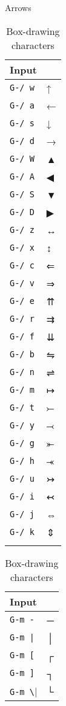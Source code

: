 \documentclass[oneside]{memoir}
\newcommand{\key}{\verb}
\begin{document}
{{{\begin{table}[!b]
\centering
\begin{minipage}{0.2\linewidth}
\caption{Arrows}
\label{tab:arrows}
\centering
\begin{tabular}{l>{\fallbackfontsymbol}l}
\toprule
Input & \multicolumn{1}{l}{Result} \\
\midrule
\key|G-/ w| & ↑ \\
\key|G-/ a| & ← \\
\key|G-/ s| & ↓ \\
\key|G-/ d| & → \\
\key|G-/ W| & ▲ \\
\key|G-/ A| & ◀ \\
\key|G-/ S| & ▼ \\
\key|G-/ D| & ▶ \\
\key|G-/ z| & ↔ \\
\key|G-/ x| & ↕ \\
\key|G-/ c| & ⇐ \\
\key|G-/ v| & ⇒ \\
\key|G-/ e| & ⇈ \\
\key|G-/ r| & ⇉ \\
\key|G-/ f| & ⇊ \\
\key|G-/ b| & ⇋ \\
\key|G-/ n| & ⇌ \\
\key|G-/ m| & ↦ \\
\key|G-/ t| & ⤚ \\
\key|G-/ y| & ⤙ \\
\key|G-/ g| & ⤜ \\
\key|G-/ h| & ⤛ \\
\key|G-/ u| & ↣ \\
\key|G-/ i| & ↢ \\
\key|G-/ j| & ⇔ \\
\key|G-/ k| & ⇕ \\
\bottomrule&
\end{tabular}
\end{minipage}\hfill
\begin{minipage}{0.3\linewidth}
\centering
\caption{Box-drawing characters}
\label{tab:box-drawing}
\begin{tabular}{l >{\fallbackfontsymbol}l}
\toprule
Input & \multicolumn{1}{l}{Result} \\
\midrule
\key|G-m -| & ─ \\
\key!G-m |! & │ \\
\key|G-m [| & ┌ \\
\key|G-m ]| & ┐ \\
\key|G-m \| & └ \\

\end{tabular}
\end{minipage}
\end{table}}}}
\end{document}
